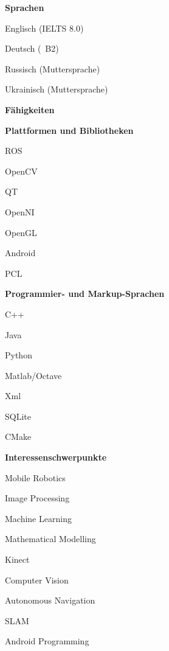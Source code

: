 \documentclass[a4paper,12pt,final]{memoir}
\newcommand{\Sep}{\vspace{1.5em}}
\newcommand{\SmallSep}{\vspace{0.5em}}
\newcommand{\CVSection}[1]
	{\Large\textbf{#1}\par
	\SmallSep\normalsize\normalfont}
\newcommand{\CVItem}[1]
	{\textbf{\color{MidnightBlue} #1}}
\begin{document}
\CVSection{Sprachen}
\begin{compactitem}[\color{MidnightBlue}$\circ$]
	\item Englisch (IELTS 8.0)
	\item Deutsch (~B2) 
	\item Russisch (Muttersprache) 
	\item Ukrainisch (Muttersprache)
\end{compactitem}
\SmallSep

\framebreak
\clearpage
\framebreak
\framebreak
\CVSection{F\"{a}higkeiten}
\CVItem{Plattformen und Bibliotheken}
\begin{multicols}{3}
\begin{compactitem}[\color{MidnightBlue}$\circ$]
	\item ROS 
	\item OpenCV
	\item QT
	\item OpenNI 
	\item OpenGL
	\item Android
	\item PCL
\end{compactitem}
\end{multicols}
\Sep

\CVItem{Programmier- und Markup-Sprachen}
\begin{multicols}{3}
\begin{compactitem}[\color{MidnightBlue}$\circ$]
	\item C++ 
	\item Java 
	\item Python 
	\item Matlab/Octave 
	\item Xml
	\item SQLite
	\item CMake
\end{compactitem}
\end{multicols}
\SmallSep

\CVItem{Interessenschwerpunkte}
\begin{compactitem}[\color{MidnightBlue}$\circ$]
	\item Mobile Robotics
	\item Image Processing 
	\item Machine Learning
	\item Mathematical Modelling
	\item Kinect 
	\item Computer Vision 
	\item Autonomous Navigation
	\item SLAM
	\item Android Programming
\end{compactitem}
\SmallSep
\end{document}
